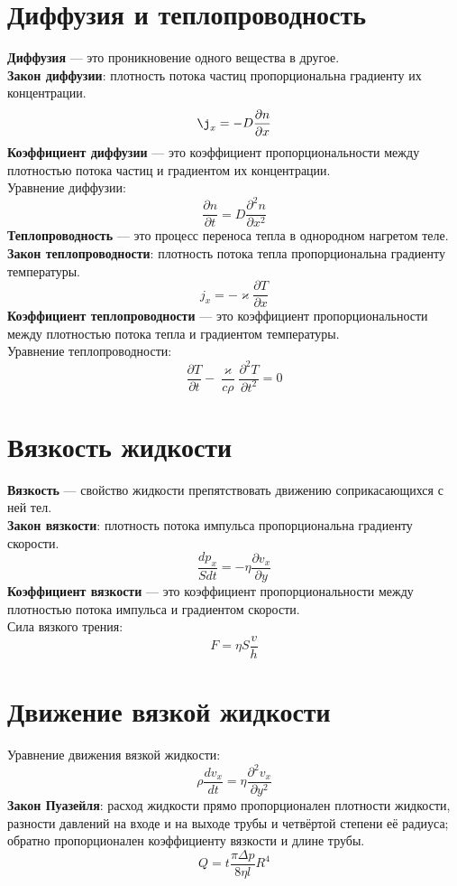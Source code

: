 \documentclass[fleqn,a4paper,12pt,titlepage,finall]{article}
\begin{document}
\section{Диффузия и теплопроводность}
{\bf Диффузия} --- это проникновение одного вещества в другое. \\
{\bf Закон диффузии}: плотность потока частиц пропорциональна градиенту их
концентрации. \\
\[\j_x = -D\frac{\partial n}{\partial x}\]
{\bf Коэффициент диффузии} --- это коэффициент пропорциональности между
плотностью потока частиц и градиентом их концентрации. \\
Уравнение диффузии:
\[\frac{\partial n}{\partial t} = D\frac{\partial^2 n}{\partial x^2}\]
{\bf Теплопроводность} --- это процесс переноса тепла в однородном нагретом
теле. \\
{\bf Закон теплопроводности}: плотность потока тепла пропорциональна градиенту
температуры.
\[j_x = -\varkappa\frac{\partial T}{\partial x}\]
{\bf Коэффициент теплопроводности} --- это коэффициент пропорциональности между
плотностью потока тепла и градиентом температуры. \\
Уравнение теплопроводности:
\[\frac{\partial T}{\partial t} -
\frac{\varkappa}{c\rho} \frac{\partial^2 T}{\partial t^2} = 0\]

\section{Вязкость жидкости}
{\bf Вязкость} --- свойство жидкости препятствовать движению соприкасающихся с
ней тел. \\
{\bf Закон вязкости}: плотность потока импульса пропорциональна градиенту
скорости.
\[\frac{dp_x}{Sdt} = -\eta\frac{\partial v_x}{\partial y}\]
{\bf Коэффициент вязкости} --- это коэффициент пропорциональности между
плотностью потока импульса и градиентом скорости. \\
Сила вязкого трения:
\[F = \eta S \frac{v}{h}\]

\section{Движение вязкой жидкости}
Уравнение движения вязкой жидкости:
\[\rho\frac{dv_x}{dt} = \eta\frac{\partial^2 v_x}{\partial y^2}\]
{\bf Закон Пуазейля}: расход жидкости прямо пропорционален плотности жидкости,
разности давлений на входе и на выходе трубы и четвёртой степени её радиуса;
обратно пропорционален коэффициенту вязкости и длине трубы.
\[Q=t\frac{\pi \Delta p}{8\eta l}R^4\]
\end{document}

